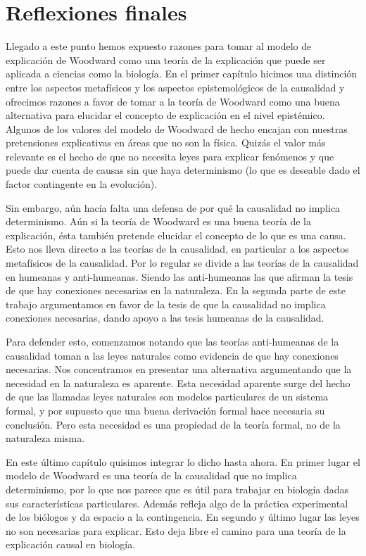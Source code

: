 
\chapter*{Reflexiones finales}

\noindent Llegado a este punto hemos expuesto razones para tomar al modelo de explicación de Woodward como una teoría de la explicación que puede ser aplicada a ciencias como la biología. En el primer capítulo hicimos una distinción entre los aspectos metafísicos y los aspectos epistemológicos de la causalidad y ofrecimos razones a favor de tomar a la teoría de Woodward como una buena alternativa para elucidar el concepto de explicación en el nivel epistémico. Algunos de los valores del modelo de Woodward de hecho encajan con nuestras pretensiones explicativas en áreas que no son la física. Quizás el valor más relevante es el hecho de que no necesita leyes para explicar fenómenos y que puede dar cuenta de causas sin que haya determinismo (lo que es deseable dado el factor contingente en la evolución).

Sin embargo, aún hacía falta una defensa de por qué la causalidad no implica determinismo. Aún si la teoría de Woodward es una buena teoría de la explicación, ésta también pretende elucidar el concepto de lo que es una causa. Esto nos lleva directo a las teorías de la causalidad, en particular a los aspectos metafísicos de la causalidad. Por lo regular se divide a las teorías de la causalidad en humeanas y anti-humeanas. Siendo las anti-humeanas las que afirman la tesis de que hay conexiones necesarias en la naturaleza. En la segunda parte de este trabajo argumentamos en favor de la tesis de que la causalidad no implica conexiones necesarias, dando apoyo a las tesis humeanas de la causalidad.

Para defender esto, comenzamos notando que las teorías anti-humeanas de la causalidad toman a las leyes naturales como evidencia de que hay conexiones necesarias. Nos concentramos en presentar una alternativa argumentando que la necesidad en la naturaleza es aparente. Esta necesidad aparente surge del hecho de que las llamadas leyes naturales son modelos particulares de un sistema formal, y por supuesto que una buena derivación formal hace necesaria su conclusión. Pero esta necesidad es una propiedad de la teoría formal, no de la naturaleza misma.

En este último capítulo quisimos integrar lo dicho hasta ahora. En primer lugar el modelo de Woodward es una teoría de la causalidad que no implica determinismo, por lo que nos parece que es útil para trabajar en biología dadas sus características particulares. Además refleja algo de la práctica experimental de los biólogos y da espacio a la contingencia. En segundo y último lugar las leyes no son necesarias para explicar. Esto deja libre el camino para una teoría de la explicación causal en biología.

